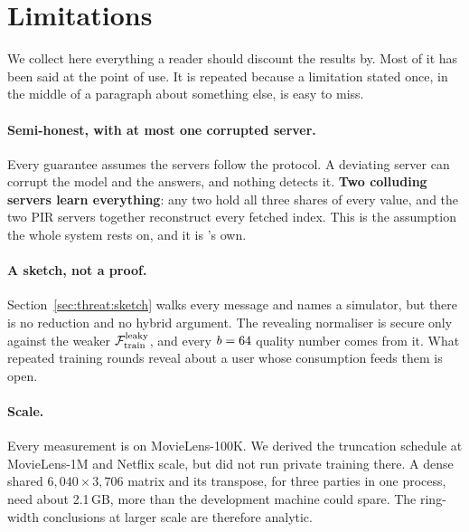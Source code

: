 \section{Limitations}
\label{sec:limits}

We collect here everything a reader should discount the results by. Most of it
has been said at the point of use. It is repeated because a limitation stated
once, in the middle of a paragraph about something else, is easy to miss.

\paragraph{Semi-honest, with at most one corrupted server.} Every guarantee
assumes the servers follow the protocol. A deviating server can corrupt the
model and the answers, and nothing detects it. \textbf{Two colluding servers
learn everything}: any two hold all three shares of every value, and the two PIR
servers together reconstruct every fetched index. This is the assumption the
whole system rests on, and it is \nudgeplain{}'s own.

\paragraph{A sketch, not a proof.} Section~\ref{sec:threat:sketch} walks every
message and names a simulator, but there is no reduction and no hybrid argument.
The revealing normaliser is secure only against the weaker $\mathcal{F}_{\mathrm{train}}^{\mathrm{leaky}}$, and every
$b = 64$ quality number comes from it. What repeated training rounds reveal
about a user whose consumption feeds them is open.

\paragraph{Scale.} Every measurement is on MovieLens-100K. We derived the
truncation schedule at MovieLens-1M and Netflix scale, but did not run private
training there. A dense shared $6{,}040 \times 3{,}706$ matrix and its transpose,
for three parties in one process, need about 2.1\,GB, more than the development
machine could spare. The ring-width conclusions at larger scale are therefore
analytic.

